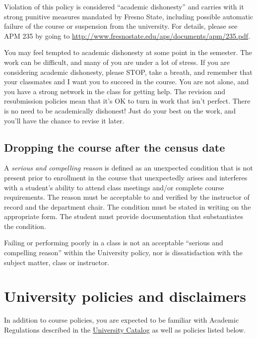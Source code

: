Violation of this policy is considered ``academic dishonesty'' and
carries with it strong punitive measures mandated by Fresno State,
including possible automatic failure of the course or suspension from
the university. For details, please see APM 235 by going to
\url{http://www.fresnostate.edu/aps/documents/apm/235.pdf}.

You may feel tempted to academic dishonesty at some point in the
semester. The work can be difficult, and many of you are under a lot of
stress. If you are considering academic dishonesty, please STOP, take a
breath, and remember that your classmates and I want you to succeed in
the course. You are not alone, and you have a strong network in the
class for getting help. The revision and resubmission policies mean that
it's OK to turn in work that isn't perfect. There is no need to be
academically dishonest! Just do your best on the work, and you'll have
the chance to revise it later.

\hypertarget{dropping-the-course-after-the-census-date}{%
\subsection{Dropping the course after the census
date}\label{dropping-the-course-after-the-census-date}}

A \emph{serious and compelling reason} is defined as an unexpected
condition that is not present prior to enrollment in the course that
unexpectedly arises and interferes with a student's ability to attend
class meetings and/or complete course requirements. The reason must be
acceptable to and verified by the instructor of record and the
department chair. The condition must be stated in writing on the
appropriate form. The student must provide documentation that
substantiates the condition.

Failing or performing poorly in a class is not an acceptable ``serious
and compelling reason'' within the University policy, nor is
dissatisfaction with the subject matter, class or instructor.

\hypertarget{university-policies-and-disclaimers}{%
\section{University policies and
disclaimers}\label{university-policies-and-disclaimers}}

In addition to course policies, you are expected to be familiar with
Academic Regulations described in the
\href{http://www.fresnostate.edu/catalog/academic-regulations/}{University
Catalog} as well as policies listed below.

